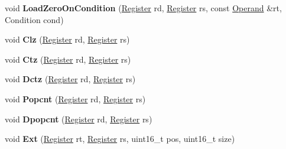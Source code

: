 \begin{DoxyCompactItemize}
void {\bfseries Load\+Zero\+On\+Condition} (\mbox{\hyperlink{classv8_1_1internal_1_1Register}{Register}} rd, \mbox{\hyperlink{classv8_1_1internal_1_1Register}{Register}} rs, const \mbox{\hyperlink{classv8_1_1internal_1_1Operand}{Operand}} \&rt, Condition cond)
\item 
\mbox{\label{classv8_1_1internal_1_1TurboAssembler_a7457dbd291f309e7850e502d28b9ffe2}} 
void {\bfseries Clz} (\mbox{\hyperlink{classv8_1_1internal_1_1Register}{Register}} rd, \mbox{\hyperlink{classv8_1_1internal_1_1Register}{Register}} rs)
\item 
\mbox{\label{classv8_1_1internal_1_1TurboAssembler_a9f75ffc2e7c4792cb20920e04385b0e3}} 
void {\bfseries Ctz} (\mbox{\hyperlink{classv8_1_1internal_1_1Register}{Register}} rd, \mbox{\hyperlink{classv8_1_1internal_1_1Register}{Register}} rs)
\item 
\mbox{\label{classv8_1_1internal_1_1TurboAssembler_a1ba30f19bfb59bf7bb3cb5b341dbbfa8}} 
void {\bfseries Dctz} (\mbox{\hyperlink{classv8_1_1internal_1_1Register}{Register}} rd, \mbox{\hyperlink{classv8_1_1internal_1_1Register}{Register}} rs)
\item 
\mbox{\label{classv8_1_1internal_1_1TurboAssembler_a6db87a88099d88cb9e3396ae729a3ca6}} 
void {\bfseries Popcnt} (\mbox{\hyperlink{classv8_1_1internal_1_1Register}{Register}} rd, \mbox{\hyperlink{classv8_1_1internal_1_1Register}{Register}} rs)
\item 
\mbox{\label{classv8_1_1internal_1_1TurboAssembler_a6a44af7cd350ffac9ebf851439c02b76}} 
void {\bfseries Dpopcnt} (\mbox{\hyperlink{classv8_1_1internal_1_1Register}{Register}} rd, \mbox{\hyperlink{classv8_1_1internal_1_1Register}{Register}} rs)
\item 
\mbox{\label{classv8_1_1internal_1_1TurboAssembler_a578bec9ac660262b9260399697b4b5ca}} 
void {\bfseries Ext} (\mbox{\hyperlink{classv8_1_1internal_1_1Register}{Register}} rt, \mbox{\hyperlink{classv8_1_1internal_1_1Register}{Register}} rs, uint16\+\_\+t pos, uint16\+\_\+t size)
\item 
\mbox{\label{classv8_1_1internal_1_1TurboAssembler_ab48dc2acd61713afc0d07662a611e0b8}} 

\end{DoxyCompactItemize}
